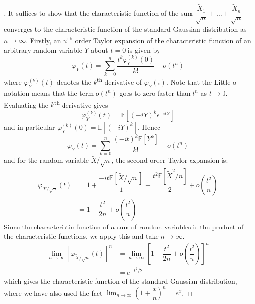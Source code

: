 \documentclass[11pt]{report} %
\begin{document}
\begin{proof}[\cite{Kallenberg1997}]
It suffices to show that the characteristic function of the sum $\dfrac{\widetilde{X}_{1}}{\sqrt{n}} + \dots + \dfrac{\widetilde{X}_{n}}{\sqrt{n}}$ converges to the characteristic function of the standard Gaussian distribution as $n\to\infty$. Firstly, an $n$\textsuperscript{th} order Taylor expansion of the characteristic function of an arbitrary random variable $Y$ about $t = 0$ is given by
\begin{equation}
\varphi_{Y}\left(t\right) = \sum_{k = 0}^{n}\dfrac{t^{k}\varphi_{Y}^{\left(k\right)}\left(0\right)}{k!} + o\left(t^{n}\right)
\end{equation}
where $\varphi_{Y}^{\left(k\right)}\left(t\right)$ denotes the $k$\textsuperscript{th} derivative of $\varphi_{Y}\left(t\right)$. Note that the Little-o notation means that the term $o\left(t^{n}\right)$ goes to zero faster than $t^{n}$ as $t\to 0$. Evaluating the $k$\textsuperscript{th} derivative gives
\begin{equation}
\varphi_{Y}^{\left(k\right)}\left(t\right) = \mathbb{E}\left[\left(-iY\right)^{k}e^{-itY}\right]
\end{equation}
and in particular $\varphi_{Y}^{\left(k\right)}\left(0\right) = \mathbb{E}\left[\left(-iY\right)^{k}\right]$. Hence
\begin{equation}
\varphi_{Y}\left(t\right) = \sum_{k = 0}^{n}\dfrac{\left(-it\right)^{k}\mathbb{E}\left[Y^{k}\right]}{k!} + o\left(t^{n}\right)
\end{equation}
and for the random variable $\widetilde{X}/\sqrt{n}$, the second order Taylor expansion is:
\begin{align}
\varphi_{\widetilde{X}/\sqrt{n}}\left(t\right) &= 1 + \dfrac{-it\mathbb{E}\left[\widetilde{X}/\sqrt{n}\right]}{1} - \dfrac{t^{2}\mathbb{E}\left[\widetilde{X}^{2}/n\right]}{2} + o\left(\dfrac{t^{2}}{n}\right) \\
&= 1 - \dfrac{t^{2}}{2n} + o\left(\dfrac{t^{2}}{n}\right)
\end{align}
Since the characteristic function of a sum of random variables is the product of the characteristic functions, we apply this and take $n\to\infty$.
\begin{align}
\lim_{n\to\infty}\left[\varphi_{\widetilde{X}/\sqrt{n}}\left(t\right)\right]^{n} &= \lim_{n\to\infty}\left[1 - \dfrac{t^{2}}{2n} + o\left(\dfrac{t^{2}}{n}\right)\right]^{n} \\
&= e^{-t^{2}/2}
\end{align}
which gives the characteristic function of the standard Gaussian distribution, where we have also used the fact $\lim_{n\to\infty}\left(1 + \dfrac{x}{n}\right)^{n} = e^{x}$.
\end{proof}
\end{document}
